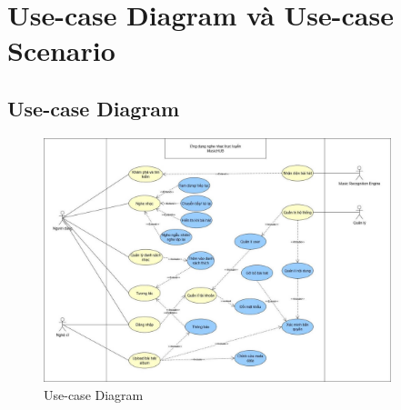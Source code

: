 \documentclass[a4paper]{article}
\begin{document}
\section{Use-case Diagram và Use-case Scenario}
\subsection{Use-case Diagram}
\begin{figure}[H]
    \centering
    \includegraphics[width=0.9\textwidth]{Images/usecase_diagram.jpg}
    \caption{Use-case Diagram}
    \label{fig:usecase_diagram}
\end{figure}
\end{document}
